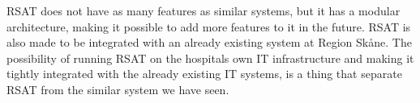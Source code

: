 \documentclass{cslthse-msc}
\begin{document}
RSAT does not have as many features as similar systems, but it has a modular architecture, making it possible to add more features to it in the future. RSAT is also made to be integrated with an already existing system at Region Skåne. The possibility of running RSAT on the hospitals own IT infrastructure and making it tightly integrated with the already existing IT systems, is a thing that separate RSAT from the similar system we have seen. 








\end{document}
